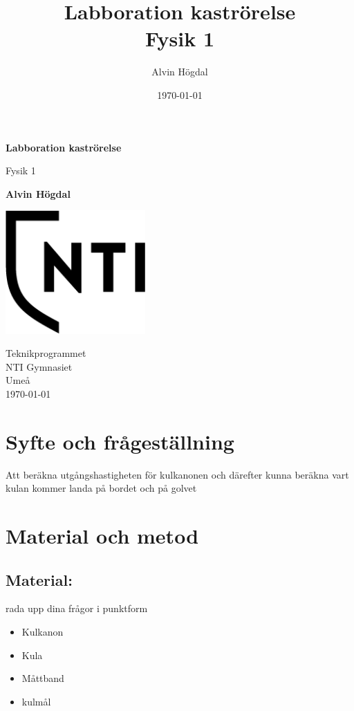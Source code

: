 \documentclass[11p]{article}
\title{Labboration kaströrelse \\ \small Fysik 1}
\author{Alvin Högdal}
\date{\today}
\begin{document}
    \begin{titlepage}
        \begin{center}
            \vspace*{1cm}

            \Huge
            \textbf{Labboration kaströrelse}

            \vspace{0.5cm}
            \LARGE
            Fysik 1

            \vspace{1.5cm}

            \textbf{Alvin Högdal}

            \vfill


            \vspace{0.8cm}

            \includegraphics[width=0.4\textwidth]{../images/NTI Gymnasiet_Symbol_print_svart.png}

            \Large
            Teknikprogrammet\\
            NTI Gymnasiet\\
            Umeå\\
            \today

        \end{center}
    \end{titlepage}
    \tableofcontents
    \newpage
    \section{Syfte och frågeställning}
    Att beräkna utgångshastigheten för kulkanonen och därefter kunna beräkna vart kulan kommer landa på bordet och på golvet
    \section{Material och metod}

    \subsection{Material:}
    rada upp dina frågor i punktform
    \begin{itemize}
        \item Kulkanon
        \item Kula
        \item Måttband
        \item kulmål
    \end{itemize}
\end{document}
